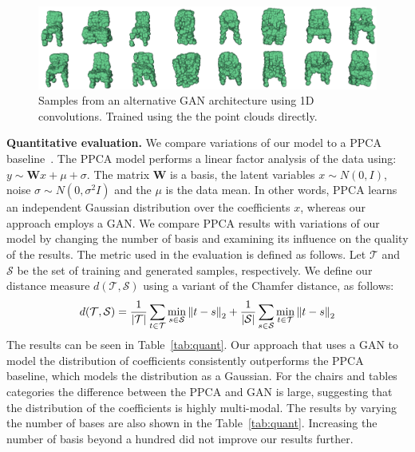 \begin{figure}[t]
\centering
\includegraphics[width=0.8\linewidth]{PCAGAN/images/chairs_1dconv.png}
\caption{\small \label{fig:1dconv} Samples from an alternative GAN architecture using 1D convolutions. Trained using the the point clouds directly.}
\vspace{-12pt}
\end{figure}


\vspace{12pt}
\noindent \textbf{Quantitative evaluation.}
We compare variations of our model to a PPCA baseline~\cite{tipping1999probabilistic}. The PPCA model performs a linear factor analysis of the data using: $y \sim \mathbf{W}x + \mu + \sigma$. The matrix $\mathbf{W}$ is a basis, the latent variables $x \sim N(0, I)$, noise $\sigma \sim N(0, \sigma^2I)$ and the $\mu$ is the data mean. In other words, PPCA learns an independent Gaussian distribution over the coefficients $x$, whereas our approach employs a GAN. We compare PPCA results with variations of our model by changing the number of basis and examining its influence on the quality of the results.
The metric used in the evaluation is defined as follows.
Let $\mathcal{T}$ and $\mathcal{S}$ be the set of training and generated samples, respectively.
We define our distance measure $d(\mathcal{T}, \mathcal{S})$ using a variant of the Chamfer distance, as follows:
\begin{equation}\label{eq:chamfer-distance}
	d(\mathcal{T}, \mathcal{S}) = 
	\frac{1}{|\mathcal{T}|} \sum_{t \in \mathcal{T}} \min_{s \in \mathcal{S}} \left\lVert t - s\right\rVert_2 +
	\frac{1}{|\mathcal{S}|} \sum_{s \in \mathcal{S}} \min_{t \in \mathcal{T}} \left\lVert t - s\right\rVert_2
\end{equation}
The results can be seen in Table~\ref{tab:quant}. Our approach that uses a GAN to model the distribution of coefficients consistently outperforms the PPCA baseline, which models the distribution as a Gaussian. For the chairs and tables categories the difference between the PPCA and GAN is large, suggesting that the distribution of the coefficients is highly multi-modal. The results by varying the number of bases are also shown in the Table~\ref{tab:quant}. Increasing the number of basis beyond a hundred did not improve our results further.


